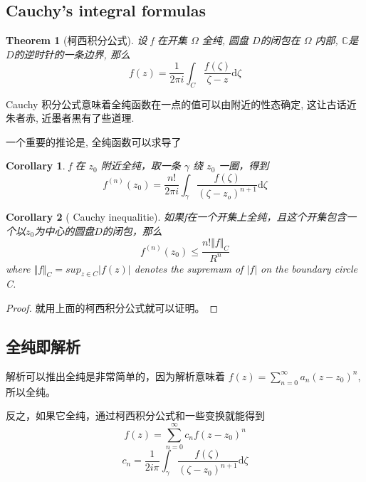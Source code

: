 \documentclass{article}
\newtheorem{theorem}{Theorem}
\newtheorem{corollary}{Corollary}
\begin{document}
\subsection{Cauchy’s integral formulas}

\begin{theorem}[柯西积分公式]
    设 f 在开集 $ \Omega $ 全纯, 圆盘 $ D $的闭包在 $ \Omega $ 内部, $ \mathbb{C} $是$  D $的逆时针的一条边界, 那么
    \begin{equation}
        f(z)=\frac{1}{2\pi i}\int_{C}\frac{f(\zeta )}{\zeta -z }\mathrm{d}\zeta
    \end{equation}

\end{theorem}

Cauchy 积分公式意味着全纯函数在一点的值可以由附近的性态确定, 这让古话近 朱者赤, 近墨者黑有了些道理.\par
一个重要的推论是, 全纯函数可以求导了
\begin{corollary}
    f 在 $ z_0 $ 附近全纯，取一条 $ \gamma $ 绕 $ z_0 $ 一圈，得到
        \begin{equation}
            f^{(n)}(z_0)=\frac{n!}{2\pi i}  \int_{\gamma}^{}\frac{f(\zeta)}{(\zeta-z_o)^{n+1}}\mathrm{d}\zeta
        \end{equation}
\end{corollary}



\begin{corollary}[ Cauchy inequalitie]
    如果f在一个开集上全纯，且这个开集包含一个以$ z_0 $为中心的圆盘$ D$的闭包，那么
    \begin{equation}
        f^{(n)}(z_0) \leqslant \frac{n! \Vert f \Vert_{C} }{R^n}
    \end{equation}
    where $ \Vert f \Vert_{C}=sup_{z \in C}\left\lvert f(z) \right\rvert $ denotes the supremum of $ \left\lvert f \right\rvert $ on the boundary circle C.
\end{corollary}
\begin{proof}
    就用上面的柯西积分公式就可以证明。
\end{proof}

\subsection{全纯即解析}

解析可以推出全纯是非常简单的，因为解析意味着 $ f(z)=\sum_{n=0}^{\infty}a_n(z-z_0)^n $, 所以全纯。\par
反之，如果它全纯，通过柯西积分公式和一些变换就能得到 
\begin{equation*}
    f(z)=\sum_{n=0}^{\infty}c_nf(z-z_0)^n
\end{equation*}
\begin{equation*}
    c_n=\frac{1}{2i\pi}\int_{\gamma}^{}\frac{f(\zeta)}{(\zeta-z_0)^{n+1}}\mathrm{d}\zeta
\end{equation*}
\end{document}
